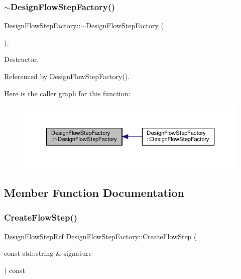 \subsubsection{\texorpdfstring{$\sim$\+Design\+Flow\+Step\+Factory()}{~DesignFlowStepFactory()}}
{\footnotesize\ttfamily Design\+Flow\+Step\+Factory\+::$\sim$\+Design\+Flow\+Step\+Factory (\begin{DoxyParamCaption}{ }\end{DoxyParamCaption})\hspace{0.3cm}{\ttfamily [virtual]}, {\ttfamily [default]}}



Destructor. 



Referenced by Design\+Flow\+Step\+Factory().

Here is the caller graph for this function\+:
\nopagebreak
\begin{figure}[H]
\begin{center}
\leavevmode
\includegraphics[width=350pt]{d4/d6f/classDesignFlowStepFactory_ad010d39c0b8c26a9889984526c8f4b17_icgraph}
\end{center}
\end{figure}


\subsection{Member Function Documentation}
\mbox{\label{classDesignFlowStepFactory_af65c5bc8971c3ae43e0f4b6fa183c1af}} 
\subsubsection{\texorpdfstring{Create\+Flow\+Step()}{CreateFlowStep()}}
{\footnotesize\ttfamily \hyperlink{design__flow__step_8hpp_a9dd6b4474ddf52d41a78b1aaa12ae6c8}{Design\+Flow\+Step\+Ref} Design\+Flow\+Step\+Factory\+::\+Create\+Flow\+Step (\begin{DoxyParamCaption}\item[{const std\+::string \&}]{signature }\end{DoxyParamCaption}) const\hspace{0.3cm}{\ttfamily [virtual]}}



